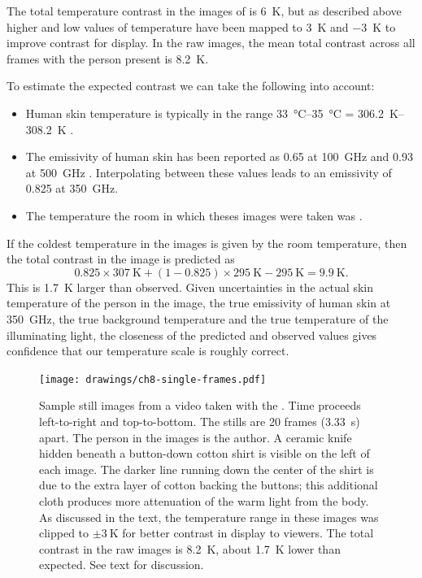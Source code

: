 The total temperature contrast in the images of  is \SI{6}{\K}, but as described above higher and low values of temperature have been mapped to \SI{+3}{\K} and \SI{-3}{\K} to improve contrast for display.
In the raw images, the mean total contrast across all frames with the person present is \SI{8.2}{\K}.

To estimate the expected contrast we can take the following into account:
\begin{itemize}
  \item Human skin temperature is typically in the range \SIrange{33}{35}{\celsius} = \SIrange{306.2}{308.2}{\K} \cite{ramanathan_new_1964}.
  \item The emissivity of human skin has been reported as \num{0.65} at \SI{100}{\GHz} and \num{0.93} at \SI{500}{\GHz} \cite{appleby_standoff_2007}.
        Interpolating between these values leads to an emissivity of \num{0.825} at \SI{350}{\GHz}.
  \item The temperature the room in which theses images were taken was .
\end{itemize}
If the coldest temperature in the images is given by the room temperature, then the total contrast in the image is predicted as
\begin{equation} \label{eqn:ch8-pred-contrast}
  0.825 \times \SI{307}{\K} + (1 - 0.825) \times \SI{295}{\K} - \SI{295}{\K} =  \SI{9.9}{\K}.
\end{equation}
This is \SI{1.7}{\K} larger than observed.
Given uncertainties in the actual skin temperature of the person in the image, the true emissivity of human skin at \SI{350}{\GHz}, the true background temperature and the true temperature of the illuminating light, the closeness of the predicted and observed values gives confidence that our temperature scale is roughly correct.

\begin{figure}
\centering
\texttt{[image: drawings/ch8-single-frames.pdf]}
\caption{
Sample still images from a video taken with the \Imager.
Time proceeds left-to-right and top-to-bottom.
The stills are 20 frames (\SI{3.33}{\s}) apart.
The person in the images is the author.
A ceramic knife hidden beneath a button-down cotton shirt is visible on the left of each image.
The darker line running down the center of the shirt is due to the extra layer of cotton backing the buttons; this additional cloth produces more attenuation of the warm light from the body.
As discussed in the text, the temperature range in these images was clipped to $\pm \SI{3}{\K}$ for better contrast in display to viewers.
The total contrast in the raw images is \SI{8.2}{\K}, about \SI{1.7}{\K} lower than expected.
See text for discussion.
}
\label{fig:ch8-single-frames}
\end{figure}

